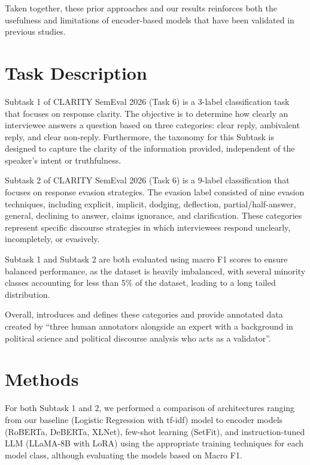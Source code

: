 \documentclass[11pt]{article}
\begin{document}
Taken together, these prior approaches and our results reinforces both the usefulness and limitations of encoder-based models that have been validated in previous studies.


\section{Task Description}


Subtask 1 of CLARITY SemEval 2026 (Task 6) is a 3-label classification task that focuses on response clarity. The objective is to determine how clearly an interviewee answers a question based on three categories: clear reply, ambivalent reply, and clear non-reply. Furthermore, the taxonomy for this Subtask is designed to capture the clarity of the information provided, independent of the speaker’s intent or truthfulness.

Subtask 2 of CLARITY SemEval 2026 (Task 6) is a 9-label classification that focuses on response evasion strategies. The evasion label consisted of nine evasion techniques, including explicit, implicit, dodging, deflection, partial/half-answer, general, declining to answer, claims ignorance, and clarification. These categories represent specific discourse strategies in which interviewees respond unclearly, incompletely, or evasively.

Subtask 1 and Subtask 2 are both evaluated using macro F1 scores to ensure balanced performance, as the dataset is heavily imbalanced, with several minority classes accounting for less than 5\% of the dataset, leading to a long tailed distribution.

Overall, \citet{thomas2024isaidthatdataset} introduces and defines these categories and provide annotated data created by “three human annotators alongside an expert with a background in political science and political discourse analysis who acts as a validator”.

\section{Methods}
For both Subtask 1 and 2, we performed a comparison of architectures ranging from our baseline (Logistic Regression with tf-idf) model to encoder models (RoBERTa, DeBERTa, XLNet), few-shot learning  (SetFit), and instruction-tuned LLM (LLaMA-8B with LoRA) using the appropriate training techniques for each model class, although evaluating the models based on Macro F1.
\end{document}
